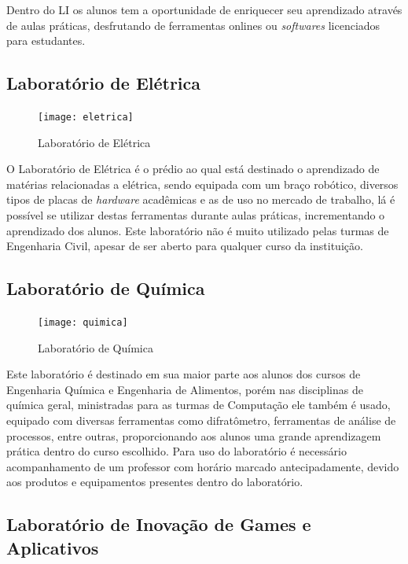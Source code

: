 \documentclass[
	12pt,				%
	oneside,			%
	a4paper,			%
	chapter=TITLE,		%
	section=TITLE,		%
	sumario=tradicional %
	english,			%
	french,				%
	spanish,			%
	brazil				%
	]{abntex2}
\begin{document}
Dentro do LI os alunos tem a oportunidade de enriquecer seu aprendizado através de aulas práticas, desfrutando de ferramentas onlines ou \textit{softwares} licenciados para estudantes.

\subsection*{Laboratório de Elétrica}

\begin{figure}[htb]
	\caption{\label{fig:eletrica} Laboratório de Elétrica}
	\begin{center}
		\texttt{[image: eletrica]}
	\end{center}
\end{figure}

O Laboratório de Elétrica é o prédio ao qual está destinado o aprendizado de matérias relacionadas a elétrica, sendo equipada com um braço robótico, diversos tipos de placas de \textit{hardware} acadêmicas e as de uso no mercado de trabalho, lá é possível se utilizar destas ferramentas durante aulas práticas, incrementando o aprendizado dos alunos. Este laboratório não é muito utilizado pelas turmas de Engenharia Civil, apesar de ser aberto para qualquer curso da instituição.

\subsection{Laboratório de Química}

\begin{figure}[htb]
	\caption{\label{fig:quimica} Laboratório de Química}
	\begin{center}
		\texttt{[image: quimica]}
	\end{center}
\end{figure}

Este laboratório é destinado em sua maior parte aos alunos dos cursos de Engenharia Química e Engenharia de Alimentos, porém nas disciplinas de química geral, ministradas para as turmas de Computação ele também é usado, equipado com diversas ferramentas como difratômetro, ferramentas de análise de processos, entre outras, proporcionando aos alunos uma grande aprendizagem prática dentro do curso escolhido. Para uso do laboratório é necessário acompanhamento de um professor com horário marcado antecipadamente, devido aos produtos e equipamentos presentes dentro do laboratório.

\subsection{Laboratório de Inovação de Games e Aplicativos}
\end{document}
